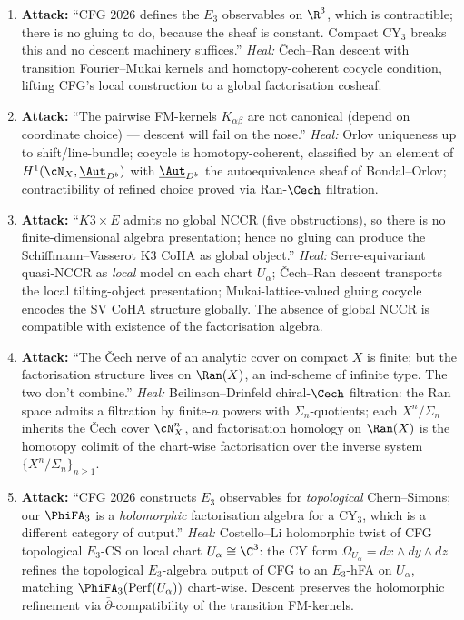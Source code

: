 \begin{enumerate}
\item[(A1)] \textbf{Attack:} ``CFG 2026 defines the $E_3$ observables
  on $\R^3$, which is contractible; there is no gluing to do, because
  the sheaf is constant. Compact CY$_3$ breaks this and no descent
  machinery suffices.''
  \emph{Heal:} Čech--Ran descent with transition Fourier--Mukai kernels
  and homotopy-coherent cocycle condition, lifting CFG's local
  construction to a global factorisation cosheaf.

\item[(A2)] \textbf{Attack:} ``The pairwise FM-kernels $K_{\alpha\beta}$
  are not canonical (depend on coordinate choice) --- descent will fail
  on the nose.''
  \emph{Heal:} Orlov uniqueness up to shift/line-bundle; cocycle is
  homotopy-coherent, classified by an element of
  $H^1(\cN_X, \underline{\Aut}_{D^b})$ with $\underline{\Aut}_{D^b}$
  the autoequivalence sheaf of Bondal--Orlov; contractibility of
  refined choice proved via Ran-$\Cech$ filtration.

\item[(A3)] \textbf{Attack:} ``$K3 \times E$ admits no global NCCR
  (five obstructions), so there is no finite-dimensional algebra
  presentation; hence no gluing can produce the Schiffmann--Vasserot K3
  CoHA as global object.''
  \emph{Heal:} Serre-equivariant quasi-NCCR as \emph{local} model on
  each chart $U_\alpha$; Čech--Ran descent transports the local
  tilting-object presentation; Mukai-lattice-valued gluing cocycle
  encodes the SV CoHA structure globally. The absence of global NCCR
  is compatible with existence of the factorisation algebra.

\item[(A4)] \textbf{Attack:} ``The Čech nerve of an analytic cover on
  compact $X$ is finite; but the factorisation structure lives on
  $\Ran(X)$, an ind-scheme of infinite type. The two don't combine.''
  \emph{Heal:} Beilinson--Drinfeld chiral-$\Cech$ filtration: the
  Ran space admits a filtration by finite-$n$ powers with
  $\Sigma_n$-quotients; each $X^n / \Sigma_n$ inherits the Čech cover
  $\cN_X^n$, and factorisation homology on $\Ran(X)$ is the homotopy
  colimit of the chart-wise factorisation over the inverse system
  $\{X^n / \Sigma_n\}_{n \geq 1}$.

\item[(A5)] \textbf{Attack:} ``CFG 2026 constructs $E_3$ observables
  for \emph{topological} Chern--Simons; our $\PhiFA_3$ is a
  \emph{holomorphic} factorisation algebra for a CY$_3$, which is a
  different category of output.''
  \emph{Heal:} Costello--Li holomorphic twist of CFG topological
  $E_3$-CS on local chart $U_\alpha \cong \C^3$: the CY form
  $\Omega_{U_\alpha} = dx \wedge dy \wedge dz$ refines the topological
  $E_3$-algebra output of CFG to an $E_3$-hFA on $U_\alpha$, matching
  $\PhiFA_3(\mathrm{Perf}(U_\alpha))$ chart-wise. Descent preserves
  the holomorphic refinement via $\bar\partial$-compatibility of the
  transition FM-kernels.
\end{enumerate}

